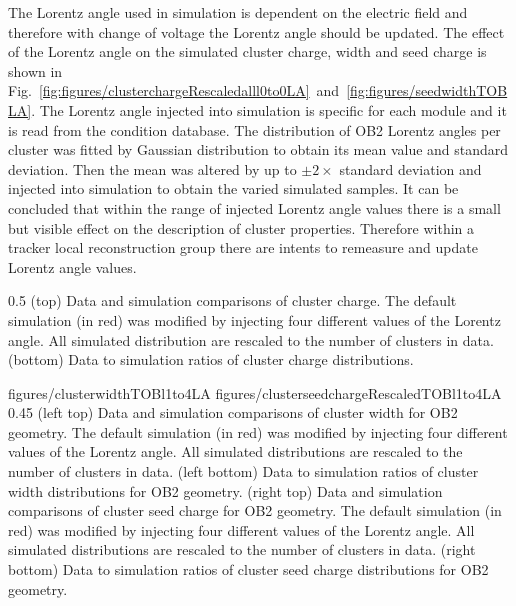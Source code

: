 The Lorentz angle used in simulation is dependent on the electric field and therefore with change of voltage the Lorentz angle should be updated. The effect of the Lorentz angle on the simulated cluster charge, width and seed charge is shown in Fig.~\ref{fig:figures/clusterchargeRescaledalll0to0LA}~and~\ref{fig:figures/seedwidthTOBLA}. The Lorentz angle injected into simulation is specific for each module and it is read from the condition database. The distribution of OB2 Lorentz angles per cluster was fitted by Gaussian distribution to obtain its mean value and standard deviation. Then the mean was altered by up to $\pm 2 \times$ standard deviation and injected into simulation to obtain the varied simulated samples. It can be concluded that within the range of injected Lorentz angle values there is a small but visible effect on the description of cluster properties. Therefore within a tracker local reconstruction group there are intents to remeasure and update Lorentz angle values.


                 {0.5}       %
                 { (top) Data and simulation comparisons of cluster charge. The default simulation (in red) was modified by injecting four different values of the Lorentz angle. All simulated distribution are rescaled to the number of clusters in data. (bottom) Data to simulation ratios of cluster charge distributions. }

                 {figures/clusterwidthTOBl1to4LA}
                 {figures/clusterseedchargeRescaledTOBl1to4LA} %
                 {0.45}       %
                 {(left top) Data and simulation  comparisons of cluster width for OB2 geometry. The default simulation (in red) was modified by injecting four different values of the Lorentz angle. All simulated distributions are rescaled to the number of clusters in data. (left bottom) Data to simulation ratios of cluster width distributions for OB2 geometry. (right top) Data and simulation  comparisons of cluster seed charge for OB2 geometry. The default simulation (in red) was modified by injecting four different values of the Lorentz angle. All simulated distributions are rescaled to the number of clusters in data. (right bottom) Data to simulation ratios of cluster seed charge distributions for OB2 geometry. }

